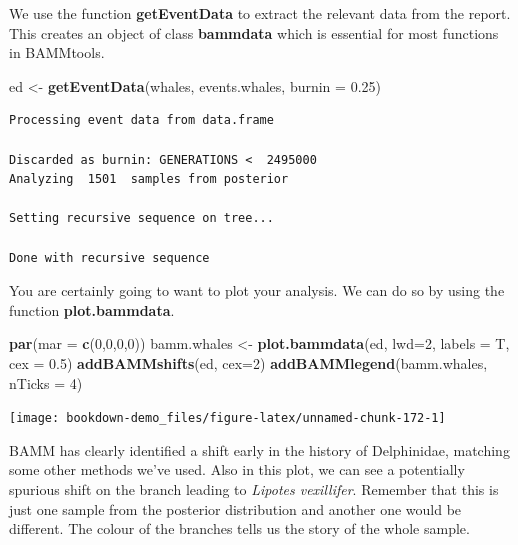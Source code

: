 \documentclass[
]{book}
\newenvironment{Shaded}{\begin{snugshade}}{\end{snugshade}}
\newcommand{\DataTypeTok}[1]{\textcolor[rgb]{0.13,0.29,0.53}{#1}}
\newcommand{\DecValTok}[1]{\textcolor[rgb]{0.00,0.00,0.81}{#1}}
\newcommand{\FloatTok}[1]{\textcolor[rgb]{0.00,0.00,0.81}{#1}}
\newcommand{\KeywordTok}[1]{\textcolor[rgb]{0.13,0.29,0.53}{\textbf{#1}}}
\newcommand{\NormalTok}[1]{#1}
\newcommand{\StringTok}[1]{\textcolor[rgb]{0.31,0.60,0.02}{#1}}
\begin{document}
We use the function \textbf{getEventData} to extract the relevant data from the report. This creates an object of class \textbf{bammdata} which is essential for most functions in BAMMtools.

\begin{Shaded}
\begin{Highlighting}[]
\NormalTok{ed \textless{}{-}}\StringTok{ }\KeywordTok{getEventData}\NormalTok{(whales, events.whales, }\DataTypeTok{burnin =} \FloatTok{0.25}\NormalTok{)}
\end{Highlighting}
\end{Shaded}

\begin{verbatim}
Processing event data from data.frame

Discarded as burnin: GENERATIONS <  2495000
Analyzing  1501  samples from posterior

Setting recursive sequence on tree...

Done with recursive sequence
\end{verbatim}

You are certainly going to want to plot your analysis. We can do so by using the function \textbf{plot.bammdata}.

\begin{Shaded}
\begin{Highlighting}[]
\KeywordTok{par}\NormalTok{(}\DataTypeTok{mar =} \KeywordTok{c}\NormalTok{(}\DecValTok{0}\NormalTok{,}\DecValTok{0}\NormalTok{,}\DecValTok{0}\NormalTok{,}\DecValTok{0}\NormalTok{))}
\NormalTok{bamm.whales \textless{}{-}}\StringTok{ }\KeywordTok{plot.bammdata}\NormalTok{(ed, }\DataTypeTok{lwd=}\DecValTok{2}\NormalTok{, }\DataTypeTok{labels =}\NormalTok{ T, }\DataTypeTok{cex =} \FloatTok{0.5}\NormalTok{)}
\KeywordTok{addBAMMshifts}\NormalTok{(ed, }\DataTypeTok{cex=}\DecValTok{2}\NormalTok{)}
\KeywordTok{addBAMMlegend}\NormalTok{(bamm.whales, }\DataTypeTok{nTicks =} \DecValTok{4}\NormalTok{)}
\end{Highlighting}
\end{Shaded}

\begin{center}\texttt{[image: bookdown-demo\_files/figure-latex/unnamed-chunk-172-1]} \end{center}

BAMM has clearly identified a shift early in the history of Delphinidae, matching some other methods we've used. Also in this plot, we can see a potentially spurious shift on the branch leading to \emph{Lipotes vexillifer}. Remember that this is just one sample from the posterior distribution and another one would be different. The colour of the branches tells us the story of the whole sample.
\end{document}

